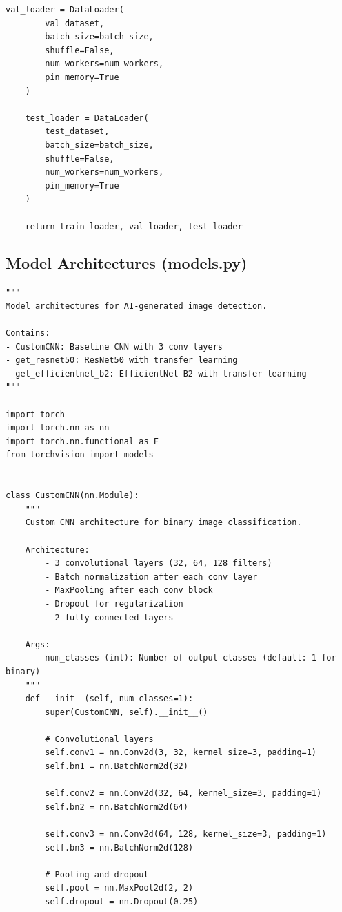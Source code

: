 \documentclass[man,12pt,letterpaper,donotrepeattitle,floatsintext]{apa7}
\begin{document}
\begin{lstlisting}[style=pythonstyle]
    val_loader = DataLoader(
        val_dataset,
        batch_size=batch_size,
        shuffle=False,
        num_workers=num_workers,
        pin_memory=True
    )
    
    test_loader = DataLoader(
        test_dataset,
        batch_size=batch_size,
        shuffle=False,
        num_workers=num_workers,
        pin_memory=True
    )
    
    return train_loader, val_loader, test_loader
\end{lstlisting}

\subsection{Model Architectures (models.py)}

\begin{lstlisting}[style=pythonstyle]
"""
Model architectures for AI-generated image detection. 

Contains:
- CustomCNN: Baseline CNN with 3 conv layers
- get_resnet50: ResNet50 with transfer learning
- get_efficientnet_b2: EfficientNet-B2 with transfer learning
"""

import torch
import torch.nn as nn
import torch.nn.functional as F
from torchvision import models


class CustomCNN(nn.Module):
    """
    Custom CNN architecture for binary image classification.
    
    Architecture:
        - 3 convolutional layers (32, 64, 128 filters)
        - Batch normalization after each conv layer
        - MaxPooling after each conv block
        - Dropout for regularization
        - 2 fully connected layers
    
    Args:
        num_classes (int): Number of output classes (default: 1 for binary)
    """
    def __init__(self, num_classes=1):
        super(CustomCNN, self).__init__()
        
        # Convolutional layers
        self.conv1 = nn.Conv2d(3, 32, kernel_size=3, padding=1)
        self.bn1 = nn.BatchNorm2d(32)
        
        self.conv2 = nn.Conv2d(32, 64, kernel_size=3, padding=1)
        self.bn2 = nn.BatchNorm2d(64)
        
        self.conv3 = nn.Conv2d(64, 128, kernel_size=3, padding=1)
        self.bn3 = nn.BatchNorm2d(128)
        
        # Pooling and dropout
        self.pool = nn.MaxPool2d(2, 2)
        self.dropout = nn.Dropout(0.25)
        

\end{lstlisting}
\end{document}
